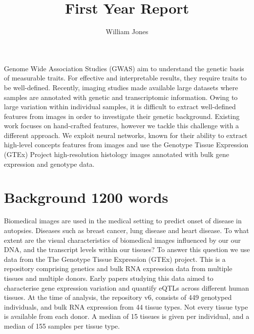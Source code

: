 \documentclass[graybox]{svmult}
\begin{document}
\title*{First Year Report}
\author{William Jones}
%
%
\maketitle



{Genome Wide Association Studies (GWAS) aim to understand the genetic basis of measurable traits. For effective and interpretable results, they require traits to be well-defined. Recently, imaging studies made available large datasets where samples are annotated with genetic and transcriptomic information. Owing to large variation within individual samples, it is difficult to extract well-defined features from images in order to investigate their genetic background. Existing work focuses on hand-crafted features, however we tackle this challenge with a different approach. We exploit neural networks, known for their ability to extract high-level concepts features from images and use the Genotype Tissue Expression (GTEx) Project high-resolution histology images annotated with bulk gene expression and genotype data.}

\section{Background 1200 words}
Biomedical images are used in the medical setting to predict onset of disease in autopsies. Diseases such as breast cancer, lung disease and heart disease. To what extent are the visual characteristics of biomedical images influenced by our our DNA, and the transcript levels within our tissues? To answer this question we use data from the The Genotype Tissue Expression (GTEx) project. This is a repository comprising genetics and bulk RNA expression data from multiple tissues and multiple donors. Early papers studying this data aimed to characterise gene expression variation and quantify eQTLs across different human tissues. At the time of analysis, the repository v6, consists of 449 genotyped individuals, and bulk RNA expression from 44 tissue types. Not every tissue type is available from each donor. A median of 15 tissues is given per individual, and a median of 155 samples per tissue type.
\end{document}
